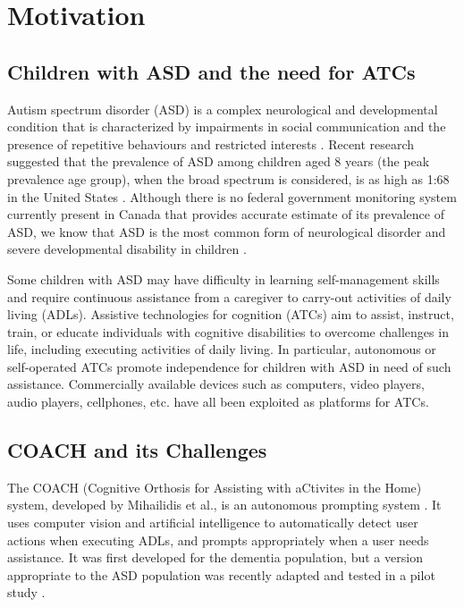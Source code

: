 \section{Motivation}

\subsection{Children with ASD and the need for ATCs}

Autism spectrum disorder (ASD) is a complex neurological and developmental condition that is characterized by impairments in social communication and the presence of repetitive behaviours and restricted interests \cite{american2013diagnostic}.  Recent research suggested that the prevalence of ASD among children aged 8 years (the peak prevalence age group), when the broad spectrum is considered, is as high as 1:68 in the United States \cite{baoi2014prevalence}.  Although there is no federal government monitoring system currently present in Canada that provides accurate estimate of its prevalence of ASD, we know that ASD is the most common form of neurological disorder and severe developmental disability in children \cite{autism2014facts}.

Some children with ASD may have difficulty in learning self-management skills and require continuous assistance from a caregiver to carry-out activities of daily living (ADLs).  Assistive technologies for cognition (ATCs) aim to assist, instruct, train, or educate individuals with cognitive disabilities to overcome challenges in life, including executing activities of daily living.  In particular, autonomous or self-operated ATCs promote independence for children with ASD in need of such assistance.  Commercially available devices such as computers, video players, audio players, cellphones, etc. have all been exploited as platforms for ATCs.


\subsection{COACH and its Challenges}

The COACH (Cognitive Orthosis for Assisting with aCtivites in the Home) system, developed by Mihailidis et al., is an autonomous prompting system \cite{mihailidis2008coach}.  It uses computer vision and artificial intelligence to automatically detect user actions when executing ADLs, and prompts appropriately when a user needs assistance.  It was first developed for the dementia population, but a version appropriate to the ASD population was recently adapted and tested in a pilot study \cite{bimbrahw2012investigating}.


